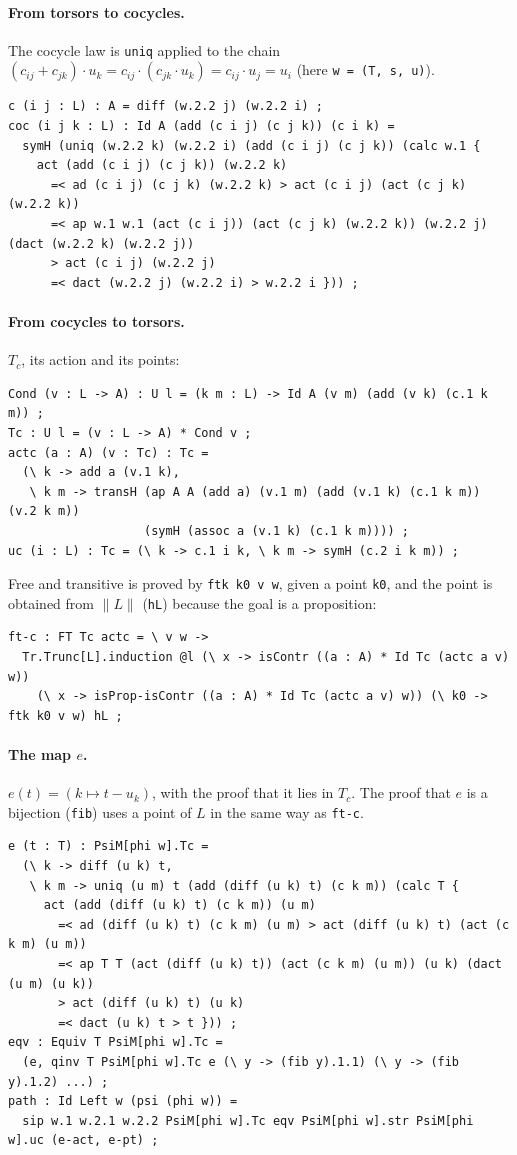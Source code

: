 \documentclass[11pt]{article}
\newcommand{\tr}[1]{\lVert #1\rVert}
\theoremstyle{remark}
\begin{document}
\paragraph{From torsors to cocycles.} The cocycle law is \verb|uniq|
applied to the chain $(c_{ij}+c_{jk})\cdot u_k=c_{ij}\cdot(c_{jk}\cdot
u_k)=c_{ij}\cdot u_j=u_i$ (here \verb|w = (T, s, u)|).
{\footnotesize
\begin{verbatim}
c (i j : L) : A = diff (w.2.2 j) (w.2.2 i) ;
coc (i j k : L) : Id A (add (c i j) (c j k)) (c i k) =
  symH (uniq (w.2.2 k) (w.2.2 i) (add (c i j) (c j k)) (calc w.1 {
    act (add (c i j) (c j k)) (w.2.2 k)
      =< ad (c i j) (c j k) (w.2.2 k) > act (c i j) (act (c j k) (w.2.2 k))
      =< ap w.1 w.1 (act (c i j)) (act (c j k) (w.2.2 k)) (w.2.2 j) (dact (w.2.2 k) (w.2.2 j))
      > act (c i j) (w.2.2 j)
      =< dact (w.2.2 j) (w.2.2 i) > w.2.2 i })) ;
\end{verbatim}}

\paragraph{From cocycles to torsors.} $T_c$, its action and its points:
{\footnotesize
\begin{verbatim}
Cond (v : L -> A) : U l = (k m : L) -> Id A (v m) (add (v k) (c.1 k m)) ;
Tc : U l = (v : L -> A) * Cond v ;
actc (a : A) (v : Tc) : Tc =
  (\ k -> add a (v.1 k),
   \ k m -> transH (ap A A (add a) (v.1 m) (add (v.1 k) (c.1 k m)) (v.2 k m))
                   (symH (assoc a (v.1 k) (c.1 k m)))) ;
uc (i : L) : Tc = (\ k -> c.1 i k, \ k m -> symH (c.2 i k m)) ;
\end{verbatim}}
\noindent Free and transitive is proved by \verb|ftk k0 v w|, given a
point \verb|k0|, and the point is obtained from $\tr{L}$ (\verb|hL|)
because the goal is a proposition:
{\footnotesize
\begin{verbatim}
ft-c : FT Tc actc = \ v w ->
  Tr.Trunc[L].induction @l (\ x -> isContr ((a : A) * Id Tc (actc a v) w))
    (\ x -> isProp-isContr ((a : A) * Id Tc (actc a v) w)) (\ k0 -> ftk k0 v w) hL ;
\end{verbatim}}

\paragraph{The map $e$.} $e(t)=(k\mapsto t-u_k)$, with the proof that it
lies in $T_c$. The proof that $e$ is a bijection (\verb|fib|) uses a
point of $L$ in the same way as \verb|ft-c|.
{\footnotesize
\begin{verbatim}
e (t : T) : PsiM[phi w].Tc =
  (\ k -> diff (u k) t,
   \ k m -> uniq (u m) t (add (diff (u k) t) (c k m)) (calc T {
     act (add (diff (u k) t) (c k m)) (u m)
       =< ad (diff (u k) t) (c k m) (u m) > act (diff (u k) t) (act (c k m) (u m))
       =< ap T T (act (diff (u k) t)) (act (c k m) (u m)) (u k) (dact (u m) (u k))
       > act (diff (u k) t) (u k)
       =< dact (u k) t > t })) ;
eqv : Equiv T PsiM[phi w].Tc =
  (e, qinv T PsiM[phi w].Tc e (\ y -> (fib y).1.1) (\ y -> (fib y).1.2) ...) ;
path : Id Left w (psi (phi w)) =
  sip w.1 w.2.1 w.2.2 PsiM[phi w].Tc eqv PsiM[phi w].str PsiM[phi w].uc (e-act, e-pt) ;
\end{verbatim}}
\end{document}
